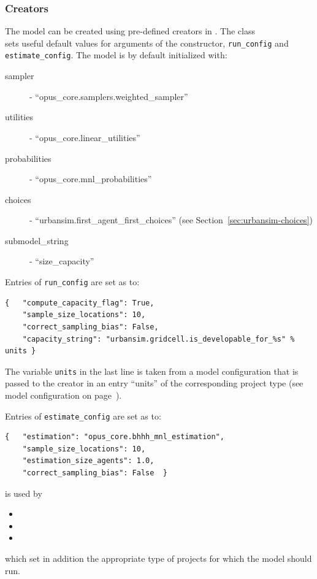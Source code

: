 \subsubsection{Creators}
%
The model can be created using pre-defined creators in .
The class\\
 sets useful default
values for arguments of the constructor, \verb|run_config| and
\verb|estimate_config|. The model is by default initialized with:
\begin{description}
\item[sampler] - ``opus_core.samplers.weighted_sampler''
\item[utilities] - ``opus_core.linear_utilities''
\item[probabilities] - ``opus_core.mnl_probabilities''
\item[choices] - ``urbansim.first_agent_first_choices'' (see
  Section~\ref{sec:urbansim-choices})
\item[submodel_string] - ``size_capacity''
\end{description}
Entries of \verb|run_config| are set as to:
\begin{verbatim}
{   "compute_capacity_flag": True,
    "sample_size_locations": 10,
    "correct_sampling_bias": False,
    "capacity_string": "urbansim.gridcell.is_developable_for_%s" % units }
\end{verbatim}
The variable \verb|units| in the last line is taken from a model configuration
that is passed to the creator in an entry ``units'' of the corresponding
project type (see model configuration on
page~\pageref{page:model-configuration}).

Entries of \verb|estimate_config| are set as to:
\begin{verbatim}
{   "estimation": "opus_core.bhhh_mnl_estimation",
    "sample_size_locations": 10,
    "estimation_size_agents": 1.0,
    "correct_sampling_bias": False  }
\end{verbatim}


 is used by
\begin{itemize}
\item {} 
\item {} 
\item {} 
\end{itemize}
which set in addition the appropriate type of projects for which the model 
should run.

